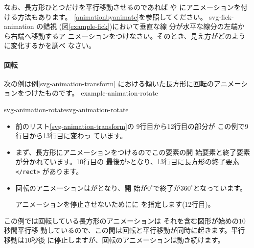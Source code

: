 なお、長方形ひとつだけを平行移動させるのであれば  や
 にアニメーションを付ける方法もあります。
\ref{animationbyanimate}を参照してください。
{svg-fick-animation}
{の錯視%
(図\ref{example-fick})において垂直な線
 分が水平な線分の左端から右端へ移動するア
 ニメーションをつけなさい。そのとき、見え方がどのように変化するかを調べ
 なさい。}

\paragraph{回転}
次の例は例\ref{svg-animation-transform}
における傾いた長方形に回転のアニメーションをつけたものです。
{example-animation-rotate}

{svg-animation-rotate}{svg-animation-rotate}
\begin{itemize}
 \item 前のリスト\ref{svg-animation-transform}の
9行目から12行目の部分が
この例で9行目から13行目に変わっ
       ています。
 \item まず、長方形にアニメーションをつけるのでこの要素の開
       始要素と終了要素が分かれています。10行目の
       最後が\texttt{>}となり、13行目に長方形の終了要素\texttt{</rect>}
       があります。
 \item 回転のアニメーションはがとなり、開
       始が$0^{\circ}$で終了が$360^{\circ}$となっています。

 アニメーションを停止させないためにに
       を指定します(12行目)。
\end{itemize}
この例では回転している長方形のアニメーションは
それを含む図形が始めの$10$秒間平行移
動しているので、この間は回転と平行移動が同時に起きます。平行移動は$10$秒後
に停止しますが、回転のアニメーションは動き続けます。

